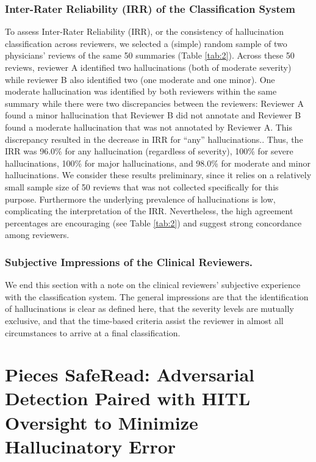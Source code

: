 \documentclass{style/myclass}
\begin{document}
\subsubsection{Inter-Rater Reliability (IRR) of the Classification System}

To assess Inter-Rater Reliability (IRR), or the consistency of hallucination classification across reviewers, we selected a (simple) random sample of two physicians’ reviews of the same 50 summaries (Table \ref{tab:2}). Across these 50 reviews, reviewer A identified two hallucinations (both of moderate severity) while reviewer B also identified two (one moderate and one minor). One moderate hallucination was identified by both reviewers within the same summary while there were two discrepancies between the reviewers: Reviewer A found a minor hallucination that Reviewer B did not annotate and Reviewer B found a moderate hallucination that was not annotated by Reviewer A. This discrepancy resulted in the decrease in IRR for “any” hallucinations.. Thus, the IRR was 96.0\% for any hallucination (regardless of severity), 100\% for severe hallucinations, 100\% for major hallucinations, and 98.0\% for moderate and minor hallucinations. We consider these results preliminary, since it relies on a relatively small sample size of 50 reviews that was not collected specifically for this purpose. Furthermore the underlying prevalence of hallucinations is low, complicating the interpretation of the IRR. Nevertheless, the high agreement percentages are encouraging (see Table \ref{tab:2}) and suggest strong concordance among reviewers.

\subsubsection{Subjective Impressions of the Clinical Reviewers.}

We end this section with a note on the clinical reviewers’ subjective experience with the classification system. The general impressions are that the identification of hallucinations is clear as defined here, that the severity levels are mutually exclusive, and that the time-based criteria assist the reviewer in almost all circumstances to arrive at a final classification.

\section{ Pieces SafeRead: Adversarial Detection Paired with HITL Oversight to Minimize Hallucinatory Error}
\end{document}
